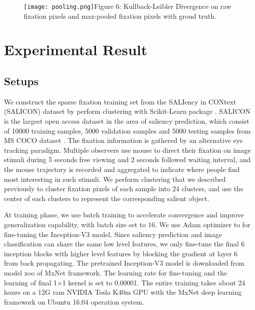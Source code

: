 \documentclass[letterpaper, 10 pt, conference]{ieeeconf}  %
\begin{document}
\begin{figure}
\centering
    \texttt{[image: pooling.png]}{Figure 6: Kullback-Leibler Divergence on raw fixation pixels and max-pooled fixation pixels with groud truth.\label{fig6}}
\end{figure}

\section{Experimental Result}

\subsection{Setups}

\par We construct the sparse fixation training set from the SALIency in CONtext (SALICON) dataset \cite{b19} by perform clustering with Scikit-Learn package \cite{b43}. SALICON is the largest open access dataset in the area of saliency prediction, which consist of 10000 training samples, 5000 validation samples and 5000 testing samples from MS COCO dataset \cite{b29}. The fixation information is gathered by an alternative eye tracking paradigm. Multiple observers use mouse to direct their fixation on image stimuli during 5 seconds free viewing and 2 seconds followed waiting interval, and the mouse trajectory is recorded and aggregated to indicate where people find most interesting in such stimuli. We perform clustering that we described previously to cluster fixation pixels of each sample into 24 clusters, and use the center of each clusters to represent the corresponding salient object.

\par At training phase, we use batch training to accelerate convergence and improve generalization capability, with batch size set to 16. We use Adam \cite{b30} optimizer to for fine-tuning the Inception-V3 model. Since saliency prediction and image classification can share the same low level features, we only fine-tune the final 6 inception blocks with higher level features by blocking the gradient at layer 6 from back propagating. The pretrained Inception-V3 model is downloaded from model zoo of MxNet framework. The learning rate for fine-tuning and the learning of final 1$\times$1 kernel is set to 0.00001. The entire training takes about 24 hours on a 12G ram NVIDIA Tesla K40m GPU with the MxNet deep learning framework \cite{b31} on Ubuntu 16.04 operation system.
\end{document}
